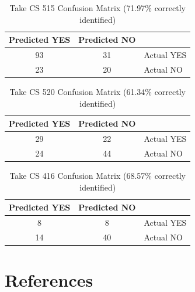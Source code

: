 \documentclass[letterpaper,11pt]{article}
\begin{document}
\begin{table}[h!]
\begin{center}
  \begin{tabular}{ c | c | l }
Predicted YES & Predicted NO & \\ \hline
93  & 31   & Actual YES \\
23  & 20  & Actual NO \\
  \end{tabular}
\end{center}
  \caption {Take CS 515 Confusion Matrix (71.97\% correctly identified)}
\label{table:515confusion}
\end{table}

\begin{table}[h!]
\begin{center}
  \begin{tabular}{ c | c | l }
Predicted YES & Predicted NO & \\ \hline
29   & 22   & Actual YES \\
24   & 44   & Actual NO \\
  \end{tabular}
\end{center}
  \caption {Take CS 520 Confusion Matrix (61.34\% correctly identified)}
\label{table:520confusion}
\end{table}

\begin{table}[h!]
\begin{center}
  \begin{tabular}{ c | c | l }
Predicted YES & Predicted NO & \\ \hline
8  & 8   & Actual YES \\
14   & 40  & Actual NO \\
  \end{tabular}
\end{center}
  \caption {Take CS 416 Confusion Matrix (68.57\% correctly identified)}
\label{table:gradcsconfusion}
\end{table}

\section{References}



\end{document}
